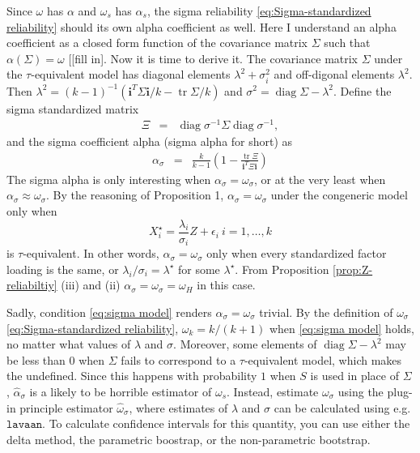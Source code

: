 \documentclass{article}
\theoremstyle{plain}
\theoremstyle{plain}
\theoremstyle{definition}
\theoremstyle{remark}
\theoremstyle{definition}
\theoremstyle{plain}
\theoremstyle{plain}
\theoremstyle{definition}
\DeclareMathOperator{\tr}{tr}
\DeclareMathOperator{\diag}{diag}
\begin{document}
Since $\omega$ has $\alpha$ and $\omega_{s}$ has $\alpha_{s}$,
the sigma reliability \eqref{eq:Sigma-standardized reliability} should
its own alpha coefficient as well. Here I understand an alpha coefficient
as a closed form function of the covariance matrix $\Sigma$ such
that $\alpha\left(\Sigma\right)=\omega$ {[}{[}fill in{]}. Now it
is time to derive it. The covariance matrix $\Sigma$ under the $\tau$-equivalent
model has diagonal elements $\lambda^{2}+\sigma_{i}^{2}$ and off-digonal
elements $\lambda^{2}$. Then $\lambda^{2}=\left(k-1\right)^{-1}\left(\mathbf{i}^{T}\Sigma\mathbf{i}/k-\tr\Sigma/k\right)$
and $\sigma^{2}=\diag\Sigma-\lambda^{2}$. Define the sigma standardized
matrix
\begin{eqnarray*}
\Xi & = & \diag\sigma^{-1}\Sigma\diag\sigma^{-1},
\end{eqnarray*}
and the sigma coefficient alpha (sigma alpha for short) as
\begin{eqnarray}
\alpha_{\sigma} & = & \frac{k}{k-1}\left(1-\frac{\tr\Xi}{\mathbf{i}^{T}\Xi\mathbf{i}}\right)\label{eq:alpha_sigma-1}
\end{eqnarray}
The sigma alpha is only interesting when $\alpha_{\sigma}=\omega_{\sigma}$,
or at the very least when $\alpha_{\sigma}\approx\omega_{\sigma}$.
By the reasoning of Proposition 1, $\alpha_{\sigma}=\omega_{\sigma}$
under the congeneric model only when 
\begin{equation}
X_{i}^{\star}=\frac{\lambda_{i}}{\sigma_{i}}Z+\epsilon_{i}\:i=1,\ldots,k\label{eq:sigma model}
\end{equation}
is $\tau$-equivalent. In other words, $\alpha_{\sigma}=\omega_{\sigma}$
only when every standardized factor loading is the same, or $\lambda_{i}/\sigma_{i}=\lambda^{\star}$
for some $\lambda^{\star}$. From Proposition \ref{prop:Z-reliabiltiy}
(iii) and (ii) $\alpha_{\sigma}=\omega_{\sigma}=\omega_{H}$ in this
case.

Sadly, condition \eqref{eq:sigma model} renders $\alpha_{\sigma}=\omega_{\sigma}$
trivial. By the definition of $\omega_{\sigma}$ \eqref{eq:Sigma-standardized reliability},
$\omega_{k}=k/\left(k+1\right)$ when \eqref{eq:sigma model} holds, no matter what values of $\lambda$ and $\sigma$.
Moreover, some elements of $\diag\Sigma-\lambda^{2}$ may be less
than $0$ when $\Sigma$ fails to correspond to a $\tau$-equivalent model, which makes the undefined. Since this happens with probability $1$ when $S$ is used in place of $\Sigma$, $\widehat{\alpha}_{\sigma}$
is a likely to be horrible estimator of $\omega_{s}$. Instead,
estimate $\omega_{\sigma}$ using the plug-in principle estimator
$\widehat{\omega}_{\sigma}$, where estimates of $\lambda$ and $\sigma$
can be calculated using e.g. $\texttt{lavaan}$. To calculate confidence
intervals for this quantity, you can use either the delta method,
the parametric boostrap, or the non-parametric bootstrap.
\end{document}
